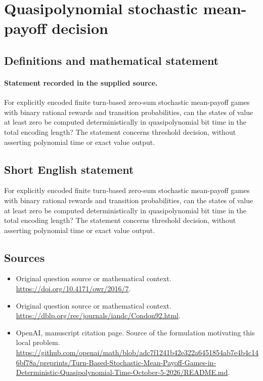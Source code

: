 \documentclass[11pt]{article}
\begin{document}
\section*{Quasipolynomial stochastic mean-payoff decision}\label{30007485}
\subsection{Definitions and mathematical statement}
\paragraph{Statement recorded in the supplied source.}
For explicitly encoded finite turn-based zero-sum stochastic mean-payoff games with binary rational rewards and transition probabilities, can the states of value at least zero be computed deterministically in quasipolynomial bit time in the total encoding length? The statement concerns threshold decision, without asserting polynomial time or exact value output.
\subsection{Short English statement}
For explicitly encoded finite turn-based zero-sum stochastic mean-payoff games with binary rational rewards and transition probabilities, can the states of value at least zero be computed deterministically in quasipolynomial bit time in the total encoding length? The statement concerns threshold decision, without asserting polynomial time or exact value output.
\subsection{Sources}
\begin{itemize}
\item[S1] Original question source or mathematical context.
\url{https://doi.org/10.4171/owr/2016/7}.
\item[S2] Original question source or mathematical context.
\url{https://dblp.org/rec/journals/iandc/Condon92.html}.
\item[S3] OpenAI, manuscript citation page. Source of the formulation motivating this local problem.
\url{https://github.com/openai/math/blob/adc7f1241b42e322a6451854ab7e4b4c146bf78a/preprints/Turn-Based-Stochastic-Mean-Payoff-Games-in-Deterministic-Quasipolynomial-Time-October-5-2026/README.md}.
\end{itemize}
\end{document}
